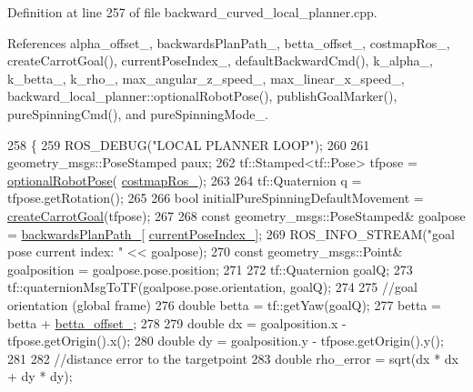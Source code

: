 Definition at line 257 of file backward\+\_\+curved\+\_\+local\+\_\+planner.\+cpp.



References alpha\+\_\+offset\+\_\+, backwards\+Plan\+Path\+\_\+, betta\+\_\+offset\+\_\+, costmap\+Ros\+\_\+, create\+Carrot\+Goal(), current\+Pose\+Index\+\_\+, default\+Backward\+Cmd(), k\+\_\+alpha\+\_\+, k\+\_\+betta\+\_\+, k\+\_\+rho\+\_\+, max\+\_\+angular\+\_\+z\+\_\+speed\+\_\+, max\+\_\+linear\+\_\+x\+\_\+speed\+\_\+, backward\+\_\+local\+\_\+planner\+::optional\+Robot\+Pose(), publish\+Goal\+Marker(), pure\+Spinning\+Cmd(), and pure\+Spinning\+Mode\+\_\+.


\begin{DoxyCode}
258 \{
259     ROS\_DEBUG(\textcolor{stringliteral}{"LOCAL PLANNER LOOP"});
260     
261     geometry\_msgs::PoseStamped paux;
262     tf::Stamped<tf::Pose> tfpose = \hyperlink{namespacebackward__local__planner_a6c2eb91307e14f740b0bec1248dfe1c7}{optionalRobotPose}(
      \hyperlink{classbackward__local__planner_1_1BackwardLocalPlanner_a0d1ac7384b0b241f4b77a0490165430a}{costmapRos\_});
263 
264     tf::Quaternion q = tfpose.getRotation();
265 
266     \textcolor{keywordtype}{bool} initialPureSpinningDefaultMovement = \hyperlink{classbackward__local__planner_1_1BackwardLocalPlanner_a8ee2775f7891177091efb91c85b3ce0c}{createCarrotGoal}(tfpose);
267 
268     \textcolor{keyword}{const} geometry\_msgs::PoseStamped& goalpose = \hyperlink{classbackward__local__planner_1_1BackwardLocalPlanner_aaa37c16e1735cb440986b3d41e6ef8e6}{backwardsPlanPath\_}[
      \hyperlink{classbackward__local__planner_1_1BackwardLocalPlanner_af2485562720c0ce3c895debdbdfc89f3}{currentPoseIndex\_}];
269     ROS\_INFO\_STREAM(\textcolor{stringliteral}{"goal pose current index: "} << goalpose);
270     \textcolor{keyword}{const} geometry\_msgs::Point& goalposition = goalpose.pose.position;
271 
272     tf::Quaternion goalQ;
273     tf::quaternionMsgToTF(goalpose.pose.orientation, goalQ);
274 
275     \textcolor{comment}{//goal orientation (global frame)}
276     \textcolor{keywordtype}{double} betta = tf::getYaw(goalQ);
277     betta = betta + \hyperlink{classbackward__local__planner_1_1BackwardLocalPlanner_a3eeb4150cba2ff54d177b9a51c6c17cb}{betta\_offset\_};
278 
279     \textcolor{keywordtype}{double} dx = goalposition.x - tfpose.getOrigin().x();
280     \textcolor{keywordtype}{double} dy = goalposition.y - tfpose.getOrigin().y();
281 
282     \textcolor{comment}{//distance error to the targetpoint}
283     \textcolor{keywordtype}{double} rho\_error = sqrt(dx * dx + dy * dy);

\end{DoxyCode}

